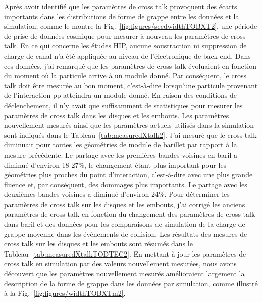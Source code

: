 Après avoir identifié que les paramètres de cross talk provoquent des écarts importants dans les distributions de forme de grappe entre les données et la simulation, comme le montre la Fig.~\ref{fig:figures/seedwidthTOBXT2}, une période de prise de données cosmique pour mesurer à nouveau les paramètres de cross talk. En ce qui concerne les études HIP, aucune soustraction ni suppression de charge de canal n’a été appliquée au niveau de l’électronique de back-end. Dans ces données, j'ai remarqué que les paramètres de cross-talk évoluaient en fonction du moment où la particule arrive à un module donné. Par conséquent, le cross talk doit être mesurée au bon moment, c'est-à-dire lorsqu'une particule provenant de l'interaction pp atteindra un module donné. En raison des conditions de déclenchement, il n'y avait que suffisamment de statistiques pour mesurer les paramètres de cross talk dans les disques et les embouts. Les paramètres nouvellement mesurés ainsi que les paramètres actuels utilisés dans la simulation sont indiqués dans le Tableau~\ref{tab:measuredXtalk2}. J'ai mesuré que le cross talk diminuait pour toutes les géométries de module de barillet par rapport à la mesure précédente. Le partage avec les premières bandes voisines en baril a diminué d'environ 18-27\%, le changement étant plus important pour les géométries plus proches du point d'interaction, c'est-à-dire avec une plus grande fluence et, par conséquent, des dommages plus importants. Le partage avec les deuxièmes bandes voisines a diminué d'environ 24\%. Pour déterminer les paramètres de cross talk sur les disques et les embouts, j'ai corrigé les anciens paramètres de cross talk en fonction du changement des paramètres de cross talk dans baril et des données pour les comparaisons de simulation de la charge de grappe moyenne dans les événements de collision. Les résultats des mesures de cross talk sur les disques et les embouts sont résumés dans le Tableau~\ref{tab:measuredXtalkTODTEC2}. En mettant à jour les paramètres de cross talk en simulation par des valeurs nouvellement mesurées, nous avons découvert que les paramètres nouvellement mesurés amélioraient largement la description de la forme de grappe dans les données par simulation, comme illustré à la Fig.~\ref{fig:figures/widthTOBXTm2}.

